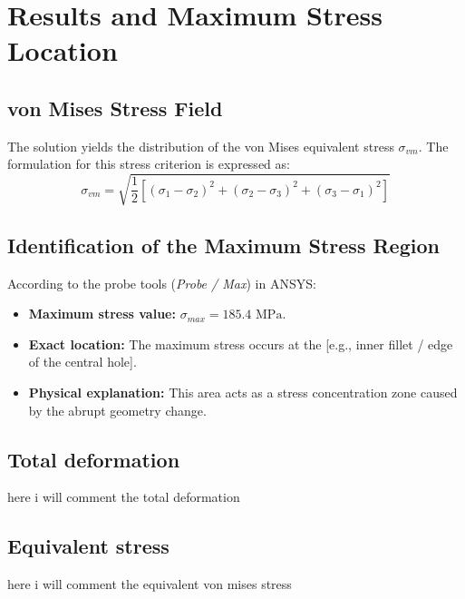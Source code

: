 \documentclass[12pt, a4paper]{article}
\begin{document}
	\section{Results and Maximum Stress Location}
	\subsection{von Mises Stress Field}
	The solution yields the distribution of the von Mises equivalent stress $\sigma_{vm}$. The formulation for this stress criterion is expressed as:
	\begin{equation}
		\sigma_{vm} = \sqrt{\frac{1}{2} \left[ (\sigma_1 - \sigma_2)^2 + (\sigma_2 - \sigma_3)^2 + (\sigma_3 - \sigma_1)^2 \right]}
	\end{equation}
	
	
	\subsection{Identification of the Maximum Stress Region}
	According to the probe tools (\textit{Probe / Max}) in ANSYS:
	\begin{itemize}
		\item \textbf{Maximum stress value:} $\sigma_{max} = 185.4\text{ MPa}$.
		\item \textbf{Exact location:} The maximum stress occurs at the [e.g., inner fillet / edge of the central hole].
		\item \textbf{Physical explanation:} This area acts as a stress concentration zone caused by the abrupt geometry change.
	\end{itemize}
	
	\subsection{Total deformation}
	
	
	here i will comment the total deformation 
	
	
	\subsection{Equivalent stress}
	
	here i will comment the equivalent von mises stress
	
\end{document}
